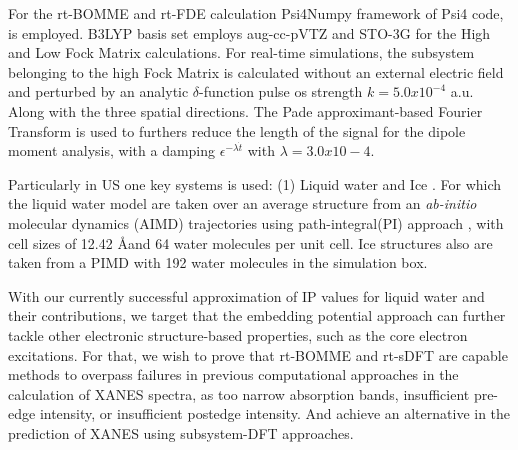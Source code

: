 \documentclass[notitlepage,12pt]{report}
\begin{document}
	For the rt-BOMME and rt-FDE calculation Psi4Numpy\supercite{smith2018psi4numpy} framework of Psi4 code\supercite{smith2020psi4}, is employed. B3LYP basis set employs aug-cc-pVTZ and STO-3G for the High and Low Fock Matrix calculations. For real-time simulations, the subsystem belonging to the high Fock Matrix is calculated without an external electric field and perturbed by an analytic $\delta$-function pulse os strength $k=5.0x10^{-4}$ a.u. Along with the three spatial directions. The Pade approximant-based Fourier Transform is used to furthers reduce the length of the signal for the dipole moment analysis, with a damping $\epsilon^{-\lambda \dot{t}}$ with $\lambda=3.0x10-4$. 

	Particularly in US one key systems is used: (1) Liquid water\supercite{gaiduk2018electron} and Ice \supercite{bergmann2007nearest,zhovtobriukh2019x}. For which the liquid water model are taken over an average structure from an \textit{ab-initio} molecular dynamics (AIMD) trajectories using path-integral(PI) approach \supercite{gaiduk2018electron}, with cell sizes of 12.42 \AA and 64 water molecules per unit cell.  Ice structures also are taken from a PIMD with 192 water molecules in the simulation box\supercite{leetmaa2010theoretical}. 
	
	With our currently successful approximation of IP values for liquid water and their contributions, we target that the embedding potential approach can further tackle other electronic structure-based properties, such as the core electron excitations. For that, we wish to prove that rt-BOMME and rt-sDFT are capable methods to overpass failures in previous computational approaches in the calculation of XANES spectra, as too narrow absorption bands, insufficient pre-edge intensity, or insufficient postedge intensity. And achieve an alternative in the prediction of XANES using subsystem-DFT approaches.

\printbibliography
\end{document}
